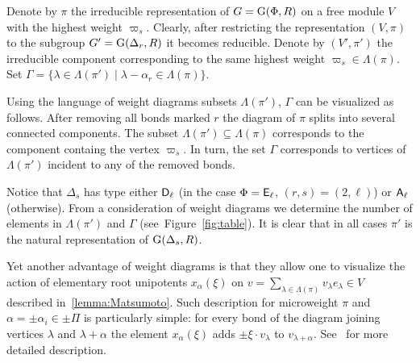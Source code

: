 Denote by $\pi$ the irreducible representation of $G=\operatorname{G}(\Phi, R)$ on a free module $V$ with the highest weight $\varpi_s$.
Clearly, after restricting the representation $(V, \pi)$ to the subgroup $G'=\operatorname{G}(\Delta_r, R)$ it becomes reducible.
Denote by $(V', \pi')$ the irreducible component corresponding to the same highest weight $\varpi_s \in \Lambda(\pi)$.
Set $\Gamma = \{\lambda \in \Lambda(\pi') \mid \lambda - \alpha_r \in \Lambda(\pi) \}.$ 

Using the language of weight diagrams subsets $\Lambda(\pi')$, $\Gamma$ can be visualized as follows.
After removing all bonds marked $r$ the diagram of $\pi$ splits into several connected components.
The subset $\Lambda(\pi') \subseteq \Lambda(\pi)$ corresponds to the component containg the vertex $\varpi_s$.
In turn, the set $\Gamma$ corresponds to vertices of $\Lambda(\pi')$ incident to any of the removed bonds.

Notice that $\Delta_s$ has type either $\mathsf{D}_\ell$ (in the case $\Phi=\mathsf{E}_\ell$, $(r,s)=(2,\ell)$) or $\mathsf{A}_\ell$ (otherwise).
From a consideration of weight diagrams we determine the number of elements in $\Lambda(\pi')$ and $\Gamma$ (see~Figure~\ref{fig:table}).
It is clear that in all cases $\pi'$ is the natural representation of $\operatorname{G}(\Delta_s, R)$.

Yet another advantage of weight diagrams is that they allow one to visualize the action of elementary root unipotents $x_\alpha(\xi)$ on $v = \sum_{\lambda \in \Lambda(\pi)} v_\lambda e_\lambda \in V$ described in~\cref{lemma:Matsumoto}.
Such description for microweight $\pi$ and $\alpha = \pm\alpha_i\in \pm\Pi$ is particularly simple: 
for every bond of the diagram joining vertices $\lambda$ and $\lambda + \alpha$ the element $x_{\alpha}(\xi)$ adds $\pm \xi \cdot v_\lambda$ to $v_{\lambda+\alpha}$.
See~\cite[Section~3.4]{PSV98} for more detailed description.

